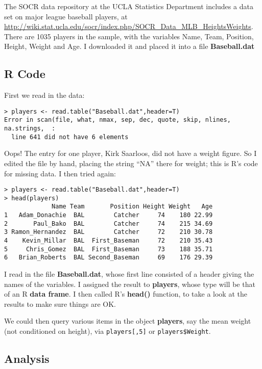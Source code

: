The SOCR data repository at the UCLA Statistics Department includes a
data set on major league baseball players, at
\url{http://wiki.stat.ucla.edu/socr/index.php/SOCR_Data_MLB_HeightsWeights}.
There are 1035 players in the sample, with the variables Name, Team,
Position, Height, Weight and Age.  I downloaded it and placed it into a
file {\bf Baseball.dat}

\subsection{R Code}

First we read in the data:

\begin{lstlisting}
> players <- read.table("Baseball.dat",header=T)
Error in scan(file, what, nmax, sep, dec, quote, skip, nlines, na.strings,  : 
  line 641 did not have 6 elements
\end{lstlisting}

Oops!  The entry for one player, Kirk Saarloos, did not have a weight
figure.  So I edited the file by hand, placing the string ``NA'' there
for weight; this is R's code for missing data.  I then tried again:

\begin{lstlisting}
> players <- read.table("Baseball.dat",header=T)
> head(players)
             Name Team       Position Height Weight   Age
1   Adam_Donachie  BAL        Catcher     74    180 22.99
2       Paul_Bako  BAL        Catcher     74    215 34.69
3 Ramon_Hernandez  BAL        Catcher     72    210 30.78
4    Kevin_Millar  BAL  First_Baseman     72    210 35.43
5     Chris_Gomez  BAL  First_Baseman     73    188 35.71
6   Brian_Roberts  BAL Second_Baseman     69    176 29.39
\end{lstlisting}

I read in the file {\bf Baseball.dat}, whose first line consisted of a
header giving the names of the variables.  I assigned the result to {\bf
players}, whose type will be that of an R {\bf data frame}.  I then
called R's {\bf head()} function, to take a look at the results to make
sure things are OK.

We could then query various items in the object {\bf players}, say the
mean weight (not conditioned on height), via \lstinline{players[,5]} or
\lstinline{players$Weight}.

\subsection{Analysis}
\label{baseballcis}

